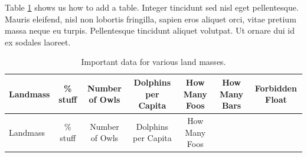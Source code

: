 \documentclass[12pt,a4paper,]{report}
\begin{document}
Table \ref{tbl:random} shows us how to add a table. Integer tincidunt
sed nisl eget pellentesque. Mauris eleifend, nisl non lobortis
fringilla, sapien eros aliquet orci, vitae pretium massa neque eu
turpis. Pellentesque tincidunt aliquet volutpat. Ut ornare dui id ex
sodales laoreet.

\newpage

\begin{longtable}[]{@{}lcccccc@{}}
\caption{Important data for various land masses.
\label{tbl:random}}\tabularnewline
\toprule
\begin{minipage}[b]{0.12\columnwidth}\raggedright
Landmass\strut
\end{minipage} & \begin{minipage}[b]{0.08\columnwidth}\centering
\% stuff\strut
\end{minipage} & \begin{minipage}[b]{0.10\columnwidth}\centering
Number of Owls\strut
\end{minipage} & \begin{minipage}[b]{0.14\columnwidth}\centering
Dolphins per Capita\strut
\end{minipage} & \begin{minipage}[b]{0.12\columnwidth}\centering
How Many Foos\strut
\end{minipage} & \begin{minipage}[b]{0.12\columnwidth}\centering
How Many Bars\strut
\end{minipage} & \begin{minipage}[b]{0.12\columnwidth}\centering
Forbidden Float\strut
\end{minipage}\tabularnewline
\midrule
\endfirsthead
\toprule
\begin{minipage}[b]{0.12\columnwidth}\raggedright
Landmass\strut
\end{minipage} & \begin{minipage}[b]{0.08\columnwidth}\centering
\% stuff\strut
\end{minipage} & \begin{minipage}[b]{0.10\columnwidth}\centering
Number of Owls\strut
\end{minipage} & \begin{minipage}[b]{0.14\columnwidth}\centering
Dolphins per Capita\strut
\end{minipage} & \begin{minipage}[b]{0.12\columnwidth}\centering
How Many Foos\strut
\end{minipage} & \begin{minipage}[b]{0.12\columnwidth}\centering

\end{minipage}
\end{longtable}
\end{document}
